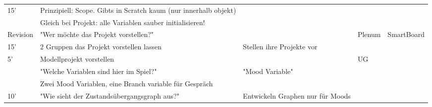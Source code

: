 \documentclass{article}
\begin{document}
\begin{tabularx}{\textwidth}{|X|X|X|X|X|}
15'                           & Prinzipiell: Scope. Gibts in Scratch kaum (nur innerhalb objekt)           &                                       &                                                                                          &                                                                             \\
                              & Gleich bei Projekt: alle Variablen sauber initialisieren!                  &                                       &                                                                                          &                                                                             \\ \hline
Revision                      & "Wer möchte das Projekt vorstellen?"                                       &                                       & Plenum                                                                                   & SmartBoard                                                                  \\
15'                           & 2 Gruppen das Projekt vorstellen lassen                                    & Stellen ihre Projekte vor             &                                                                                          &                                                                             \\ \hline
5'                            & Modellprojekt vorstellen                                                   &                                       & UG                                                                                       &                                                                             \\
                              & "Welche Variablen sind hier im Spiel?"                                     & "Mood Variable"                       &                                                                                          &                                                                             \\
                              & Zwei Mood Variablen, eine Branch variable für Gespräch                     &                                       &                                                                                          &                                                                             \\
10'                           & "Wie sieht der Zustandsübergangsgraph aus?"                                & Entwickeln Graphen nur für Moods      &                                                                                          &                                                                             \\

\end{tabularx}
\end{document}
